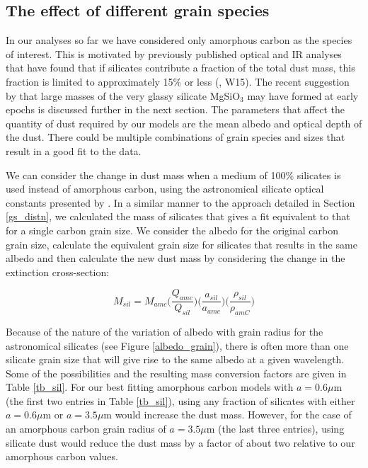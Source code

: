 \documentclass[useAMS,usenatbib,usegraphicx]{mnras}
\begin{document}
\subsection{The effect of different grain species}
\label{species}
In  our analyses so far we have considered only amorphous carbon as the species of interest.  This is motivated by previously published optical and IR analyses that have found that if silicates contribute a fraction of the total dust mass, this fraction is limited to approximately 15\% or less (\citet{Ercolano2007}, W15).  The recent suggestion by \citet{Dwek2015} that large masses of the very glassy silicate MgSiO$_3$ may have formed at early epochs is discussed further in the next section.  The parameters that affect the quantity of dust required by our models  are the mean albedo and  optical depth of the dust.  There could be multiple combinations of grain species and sizes that result in a good fit to the data.  

We can consider the change in dust mass when a medium of 100\% silicates is used instead of amorphous carbon, using the astronomical silicate optical constants presented by \cite{Draine1984}.  In a similar manner to the approach detailed in Section \ref{gs_distn}, we  calculated the mass of silicates that gives a fit equivalent to that for a single carbon grain size.  We consider the albedo for the original carbon grain size, calculate the equivalent grain size for silicates that results in the same albedo and then calculate the new dust mass by considering the change in the extinction cross-section:



\begin{equation}
M_{sil} = M_{amc} \Big( \frac{Q_{amc}}{Q_{sil}} \Big) \Big(\frac{a_{sil}}{a_{amc}}\Big) \Big(\frac{\rho_{sil}}{\rho_{amC}}\Big)
\end{equation}

Because of the nature of the variation of albedo with grain radius for the \citet{Draine1984} astronomical silicates (see Figure \ref{albedo_grain}), there is often more than one silicate grain size that will give rise to the same albedo at a given wavelength.  Some of the possibilities and the resulting mass conversion factors are given in Table \ref{tb_sil}.  For our best fitting amorphous carbon models with $a=0.6\mu$m (the first two entries in Table \ref{tb_sil}), using any fraction of silicates with either  $a=0.6\mu$m or $a=3.5\mu$m would increase the dust mass.  However, for the case of an amorphous carbon grain radius of $a=3.5\mu$m (the last three entries), using silicate dust would reduce the dust mass by a factor of about two relative to our amorphous carbon values. 
\end{document}
